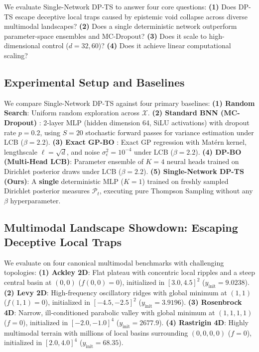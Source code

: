 \documentclass{article}
\begin{document}
We evaluate Single-Network DP-TS to answer four core questions: \textbf{(1)} Does DP-TS escape deceptive local traps caused by epistemic void collapse across diverse multimodal landscapes? \textbf{(2)} Does a single deterministic network outperform parameter-space ensembles and MC-Dropout? \textbf{(3)} Does it scale to high-dimensional control ($d=32, 60$)? \textbf{(4)} Does it achieve linear computational scaling?

\subsection{Experimental Setup and Baselines}
We compare Single-Network DP-TS against four primary baselines:
\textbf{(1) Random Search}: Uniform random exploration across $\mathcal{X}$.
\textbf{(2) Standard BNN (MC-Dropout)} \citep{gal2016dropout}: 2-layer MLP (hidden dimension 64, SiLU activations) with dropout rate $p=0.2$, using $S=20$ stochastic forward passes for variance estimation under LCB ($\beta=2.2$).
\textbf{(3) Exact GP-BO} \citep{rasmussen2006gaussian}: Exact GP regression with Mat\'ern kernel, lengthscale $\ell=\sqrt{d}$, and noise $\sigma_\epsilon^2 = 10^{-4}$ under LCB ($\beta=2.2$).
\textbf{(4) DP-BO (Multi-Head LCB)}: Parameter ensemble of $K=4$ neural heads trained on Dirichlet posterior draws under LCB ($\beta=2.2$).
\textbf{(5) Single-Network DP-TS (Ours)}: A \textbf{single} deterministic MLP ($K=1$) trained on freshly sampled Dirichlet posterior measures $\mathcal{P}_t$, executing pure Thompson Sampling without any $\beta$ hyperparameter.

\subsection{Multimodal Landscape Showdown: Escaping Deceptive Local Traps}
We evaluate on four canonical multimodal benchmarks with challenging topologies:
\textbf{(1) Ackley 2D}: Flat plateau with concentric local ripples and a steep central basin at $(0, 0)$ ($f(0, 0)=0$), initialized in $[3.0, 4.5]^2$ ($y_{\mathrm{init}} = 9.0238$).
\textbf{(2) Levy 2D}: High-frequency oscillatory ridges with global minimum at $(1, 1)$ ($f(1, 1)=0$), initialized in $[-4.5, -2.5]^2$ ($y_{\mathrm{init}} = 3.9196$).
\textbf{(3) Rosenbrock 4D}: Narrow, ill-conditioned parabolic valley with global minimum at $(1, 1, 1, 1)$ ($f=0$), initialized in $[-2.0, -1.0]^4$ ($y_{\mathrm{init}} = 2677.9$).
\textbf{(4) Rastrigin 4D}: Highly multimodal terrain with millions of local basins surrounding $(0, 0, 0, 0)$ ($f=0$), initialized in $[2.0, 4.0]^4$ ($y_{\mathrm{init}} = 68.35$).
\end{document}
